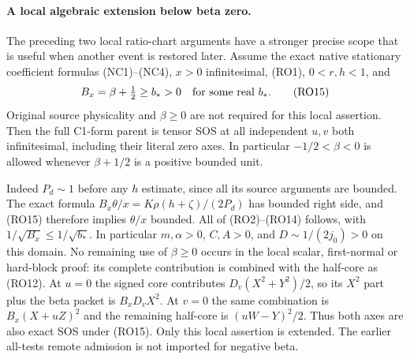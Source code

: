 \paragraph{A local algebraic extension below beta zero.}
The preceding two local ratio-chart arguments have a stronger precise
scope that is useful when another event is restored later. Assume the
exact native stationary coefficient formulas (NC1)--(NC4),
$x>0$ infinitesimal, (RO1), $0<r,h<1$, and
\[
              B_x=\beta+\tfrac12\ge b_*>0
              \quad\hbox{for some real }b_* .                 \tag{RO15}
\]
Original source physicality and $\beta\ge0$ are not required for
this local assertion. Then the full C1-form parent is tensor SOS at
all independent $u,v$ both infinitesimal, including their literal
zero axes. In particular $-1/2<\beta<0$ is allowed whenever
$\beta+1/2$ is a positive bounded unit.

Indeed $P_d\sim1$ before any $h$ estimate, since all its source
arguments are bounded. The exact formula
$B_x\theta/x=K\rho(h+\zeta)/(2P_d)$ has bounded right side,
and (RO15) therefore implies $\theta/x$ bounded. All of (RO2)--(RO14)
follows, with $1/\sqrt{B_x}\le1/\sqrt{b_*}$. In particular
$m,\alpha>0$, $C,A>0$, and $D\sim1/(2j_0)>0$ on this
domain. No remaining use of $\beta\ge0$ occurs in the local
scalar, first-normal or hard-block proof: its complete contribution
is combined with the half-core as (RO12). At $u=0$ the signed
core contributes $D_v(X^2+Y^2)/2$, so its $X^2$ part plus
the beta packet is $B_xD_vX^2$. At $v=0$ the same combination
is $B_x(X+uZ)^2$ and the remaining half-core is
$(uW-Y)^2/2$. Thus both axes are also exact SOS under (RO15).
Only this local assertion is extended. The earlier all-tests remote
admission is not imported for negative beta.
